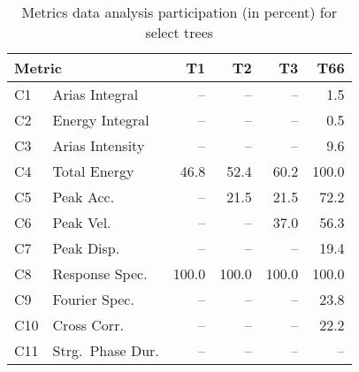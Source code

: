 
\begin{table}[t]
	\centering
	\caption{Metrics data analysis participation (in percent) for select trees }
	\label{tab:participation}
	\small
	\begin{tabular}{llrrrr}
	\multicolumn{2}{l}{Metric} 	& T1 	& T2	& T3 	& T66 	\\ 
	\hline
	C1 		& Arias Integral	& --	& --	& -- 	& 1.5	\\
	C2 		& Energy Integral	& -- 	& --	& -- 	& 0.5	\\
	C3 		& Arias Intensity	& -- 	& -- 	& -- 	& 9.6	\\
	C4 		& Total Energy		& 46.8	& 52.4	& 60.2	& 100.0	\\
	C5 		& Peak Acc.			& -- 	& 21.5	& 21.5	& 72.2	\\
	C6 		& Peak Vel.			& -- 	& -- 	& 37.0	& 56.3	\\
	C7 		& Peak Disp.		& -- 	& -- 	& -- 	& 19.4	\\
	C8 		& Response Spec.	& 100.0	& 100.0	& 100.0	& 100.0	\\
	C9 		& Fourier Spec.		& -- 	& -- 	& --	& 23.8	\\
	C10		& Cross Corr.		& -- 	& -- 	& -- 	& 22.2	\\
	C11		& Strg.~Phase Dur.	& -- 	& -- 	& -- 	& -- 	\\
	\hline
	\end{tabular}
\end{table}


